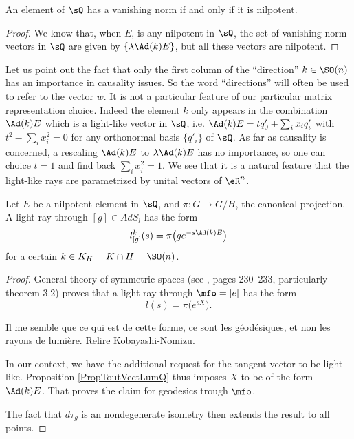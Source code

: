 \begin{corollary}		\label{CorNormZeroEQnil}
An element of $\sQ$ has a vanishing norm if and only if it is nilpotent.
\end{corollary}

\begin{proof}
We know that, when $E$, is any nilpotent in $\sQ$, the set of vanishing norm vectors in $\sQ$ are given by $\{ \lambda\Ad(k)E \}$, but all these vectors are nilpotent.
\end{proof}

Let us point out the fact that only the first column of the ``direction''{} $k\in \SO(n)$ has an importance in causality issues. So the word ``directions''{} will often be used to refer to the vector $w$. It is not a particular feature of our particular matrix representation choice. Indeed the element $k$ only appears in the combination $\Ad(k)E$ which is a light-like vector in $\sQ$, i.e. $\Ad(k)E=tq'_0+\sum_i x_iq'_i$ with $t^2-\sum_i x_i^2=0$ for any orthonormal basis $\{q'_i\}$ of $\sQ$. As far as causality is concerned, a rescaling $\Ad(k)E$ to $\lambda\Ad(k)E$ has no importance, so one can choice $t=1$ and find back $\sum_i x_i^2=1$. We see that it is a natural feature that the light-like rays are parametrized by  unital vectors of $\eR^n$.

\begin{lemma}		\label{LemGeodGenreLumiere}
Let $E$ be a nilpotent element in $\sQ$, and $\pi: G \rightarrow G/H$, the canonical projection. A light ray through $[g]\in AdS_l$ has the form
\begin{equation}
   l^k_{[g]}(s)=\pi\big( ge^{-s\Ad(k)E} \big)
\end{equation}
for a certain $k\in K_H=K\cap H=\SO(n)$.
 \label{lem:AdkEcone}
\end{lemma}

\begin{proof}
General theory of symmetric spaces (see \cite{kobayashi2}, pages 230--233, particularly theorem 3.2) proves that a light ray through $\mfo=[e]$ has the form
\[
  l(s)=\pi\big( e^{sX} \big).
\]

\begin{probleme}
	Il me semble que ce qui est de cette forme, ce sont les géodésiques, et non les rayons de lumière. Relire Kobayashi-Nomizu.
\end{probleme}


In our context, we have the additional request for the tangent vector to be light-like. Proposition \ref{PropToutVectLumQ} thus imposes $X$ to be of the form $\Ad(k)E$. That proves the claim for geodesics trough $\mfo$.

The fact that $d\tau_g$ is an nondegenerate isometry then extends the result to all points.

\end{proof}

